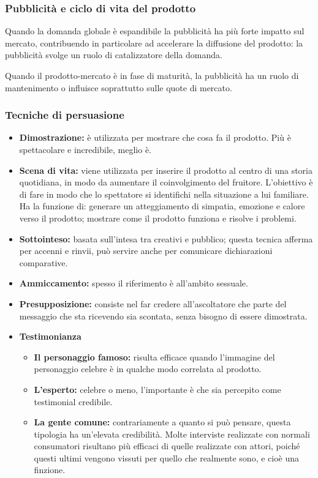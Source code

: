 \subsubsection{Pubblicità e ciclo di vita del prodotto}
Quando la domanda globale è espandibile la pubblicità ha più forte impatto sul mercato, contribuendo in particolare ad accelerare la diffusione del prodotto: la pubblicità svolge un ruolo di catalizzatore della domanda.

Quando il prodotto-mercato è in fase di maturità, la pubblicità ha un ruolo di mantenimento o influisce soprattutto sulle quote di mercato.

\subsubsection{Tecniche di persuasione}
\begin{itemize}
	\item \textbf{Dimostrazione:} è utilizzata per mostrare che cosa fa il prodotto. Più è spettacolare e incredibile, meglio è.
	\item \textbf{Scena di vita:} viene utilizzata per inserire il prodotto al centro di una storia quotidiana, in modo da aumentare il coinvolgimento del fruitore. L’obiettivo è di fare in modo che lo spettatore si identifichi nella situazione a lui familiare. Ha la funzione di: generare un atteggiamento di simpatia, emozione e calore verso il prodotto; mostrare come il prodotto funziona e risolve i problemi.
	\item \textbf{Sottointeso:} basata sull'intesa tra creativi e pubblico; questa tecnica afferma per accenni e rinvii, può servire anche per comunicare dichiarazioni comparative.
	\item \textbf{Ammiccamento:} spesso il riferimento è all’ambito sessuale.
	\item \textbf{Presupposizione:} consiste nel far credere all'ascoltatore che parte del messaggio che sta ricevendo sia scontata, senza bisogno di essere dimostrata.
	\item \textbf{Testimonianza}
	\begin{itemize}
		\item \textbf{Il personaggio famoso:} risulta efficace quando l’immagine del personaggio celebre è in qualche modo correlata al prodotto.
		\item \textbf{L’esperto:} celebre o meno, l’importante è che sia percepito come testimonial credibile.
		\item \textbf{La gente comune:} contrariamente a quanto si può pensare, questa	tipologia ha un’elevata credibilità. Molte interviste realizzate con normali consumatori risultano più efficaci di quelle realizzate con	attori, poiché questi ultimi vengono vissuti per quello che realmente sono, e cioè una finzione.
	\end{itemize}		
\end{itemize}

